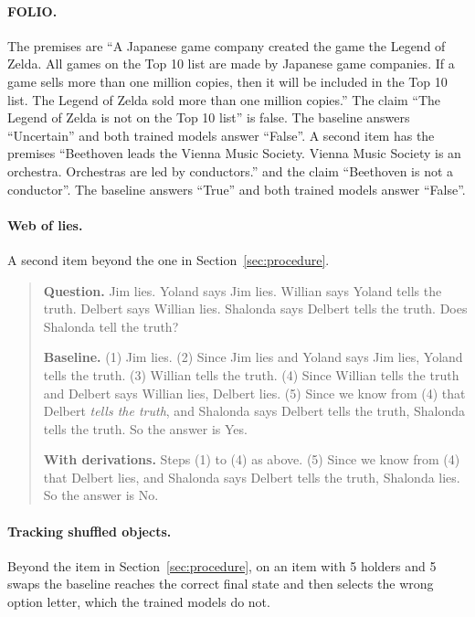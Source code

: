 \paragraph{FOLIO.} The premises are ``A Japanese game company created the
game the Legend of Zelda. All games on the Top 10 list are made by Japanese
game companies. If a game sells more than one million copies, then it will
be included in the Top 10 list. The Legend of Zelda sold more than one
million copies.'' The claim ``The Legend of Zelda is not on the Top 10 list''
is false. The baseline answers ``Uncertain'' and both trained models answer
``False''. A second item has the premises ``Beethoven leads the Vienna Music
Society. Vienna Music Society is an orchestra. Orchestras are led by
conductors.'' and the claim ``Beethoven is not a conductor''. The baseline
answers ``True'' and both trained models answer ``False''.

\paragraph{Web of lies.} A second item beyond the one in
Section~\ref{sec:procedure}.

\begin{small}
\begin{quote}
\textbf{Question.} Jim lies. Yoland says Jim lies. Willian says Yoland tells
the truth. Delbert says Willian lies. Shalonda says Delbert tells the truth.
Does Shalonda tell the truth?

\textbf{Baseline.} (1) Jim lies. (2) Since Jim lies and Yoland says Jim lies,
Yoland tells the truth. (3) Willian tells the truth. (4) Since Willian tells
the truth and Delbert says Willian lies, Delbert lies. (5) Since we know from
(4) that Delbert \emph{tells the truth}, and Shalonda says Delbert tells the
truth, Shalonda tells the truth. So the answer is Yes.

\textbf{With derivations.} Steps (1) to (4) as above. (5) Since we know from
(4) that Delbert lies, and Shalonda says Delbert tells the truth, Shalonda
lies. So the answer is No.
\end{quote}
\end{small}

\paragraph{Tracking shuffled objects.} Beyond the item in
Section~\ref{sec:procedure}, on an item with 5 holders and 5 swaps the
baseline reaches the correct final state and then selects the wrong option
letter, which the trained models do not.

